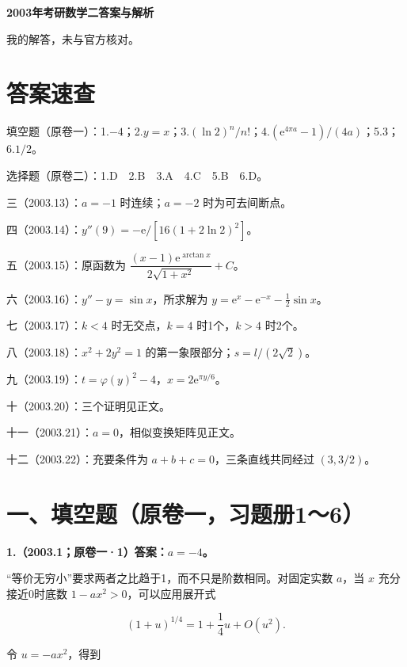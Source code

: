 \documentclass[UTF8,11pt,fontset=windows]{ctexart}
\begin{document}
{\LARGE\bfseries 2003年考研数学二答案与解析\par}\vspace{6pt}

\begingroup\color{gray}我的解答，未与官方核对。\par\endgroup

\section*{答案速查}

\begingroup\color{gray}填空题（原卷一）：1.$-4$；2.$y=x$；3.$(\ln2)^n/n!$；4.$(\mathrm e^{4\pi a}-1)/(4a)$；5.$3$；6.$1/2$。\par\endgroup

\begingroup\color{gray}选择题（原卷二）：1.D　2.B　3.A　4.C　5.B　6.D。\par\endgroup

三（2003.13）：$a=-1$ 时连续；$a=-2$ 时为可去间断点。

四（2003.14）：$y''(9)=-\mathrm e/[16(1+2\ln2)^2]$。

五（2003.15）：原函数为 $\dfrac{(x-1)\mathrm e^{\arctan x}}{2\sqrt{1+x^2}}+C$。

六（2003.16）：$y''-y=\sin x$，所求解为 $y=\mathrm e^x-\mathrm e^{-x}-\tfrac12\sin x$。

七（2003.17）：$k<4$ 时无交点，$k=4$ 时1个，$k>4$ 时2个。

八（2003.18）：$x^2+2y^2=1$ 的第一象限部分；$s=l/(2\sqrt2)$。

九（2003.19）：$t=\varphi(y)^2-4$，$x=2\mathrm e^{\pi y/6}$。

十（2003.20）：三个证明见正文。

十一（2003.21）：$a=0$，相似变换矩阵见正文。

十二（2003.22）：充要条件为 $a+b+c=0$，三条直线共同经过 $(3,3/2)$。

\clearpage

\section*{一、填空题（原卷一，习题册1～6）}

\textbf{1.（2003.1；原卷一·1）答案：$a=-4$。}

“等价无穷小”要求两者之比趋于1，而不只是阶数相同。对固定实数 $a$，当 $x$ 充分接近0时底数 $1-ax^2>0$，可以应用展开式

$$
(1+u)^{1/4}=1+\frac14u+O(u^2).
$$

令 $u=-ax^2$，得到
\end{document}
